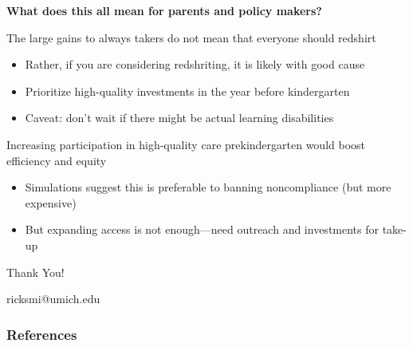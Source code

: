 \documentclass[t,aspectratio=169,11pt,presentation]{beamer}
\newenvironment{wideitemize}{\itemize\addtolength{\itemsep}{14pt}}{\enditemize}
\begin{document}
\begin{frame}{\textbf{What does this all mean for parents and policy makers?}}
\begin{wideitemize}
    \item The large gains to always takers do not mean that everyone should redshirt
    \begin{itemize}
        \item Rather, if you are considering redshriting, it is likely with good cause
        \item<2-> Prioritize high-quality investments in the year before kindergarten
        
        {\tiny \color{gray} \citep{noel2003delay,noel2008mothers,elder2009kindergarten}}
        
        \item<3-> Caveat: don't wait if there might be actual learning disabilities 
        
        {\tiny \color{gray} \citep{fortner2018delayed}}
    \end{itemize}
    
    \item<4-> Increasing participation in high-quality care prekindergarten would boost efficiency and equity
    \begin{itemize}
        \item Simulations suggest this is preferable to banning noncompliance (but more expensive)
        
        \item<5-> But expanding access is not enough---need outreach and investments for take-up
        
        {\tiny \color{gray} \citep{kline2016evaluating,cornelissen2018benefits,shapiro2019if}}
        
    \end{itemize}
\end{wideitemize}
   

\end{frame}



\begin{frame}[c]
\centering
\Huge{\centerline{Thank You!}}
\normalsize ricksmi{\selectfont @}umich.edu
\end{frame}



\begin{frame}
\frametitle{References}
\tiny

\end{frame}
\end{document}
